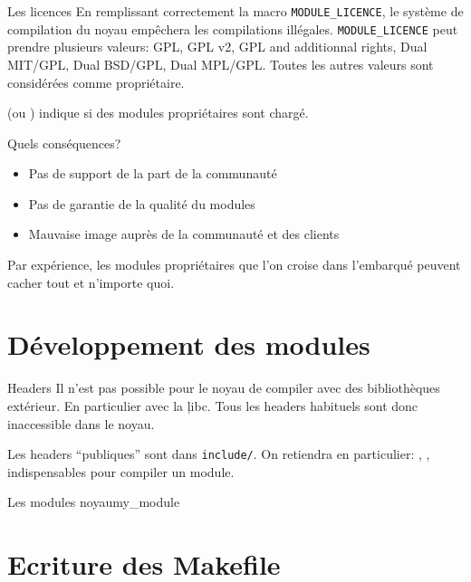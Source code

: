 \begin{frame}[fragile=singleslide]{Les licences}
  En  remplissant  correctement  la  macro  \verb+MODULE_LICENCE+,  le
  système   de  compilation  du   noyau  empêchera   les  compilations
  illégales.   \verb+MODULE_LICENCE+ peut  prendre  plusieurs valeurs:
  GPL, GPL v2, GPL and additionnal rights, Dual MIT/GPL, Dual BSD/GPL,
  Dual  MPL/GPL.  Toutes  les  autres valeurs  sont considérées  comme
  propriétaire.

   (ou  ) indique  si des
  modules propriétaires sont chargé.
  
  Quels conséquences?
  \begin{itemize} 
  \item Pas de support de la part de la communauté
  \item Pas de garantie de la qualité du modules
  \item Mauvaise image auprès de la communauté et des clients
  \end{itemize}

  Par  expérience,  les modules  propriétaires  que  l'on croise  dans
  l'embarqué peuvent cacher tout et n'importe quoi.
\end{frame}

\section{Développement des modules}

\begin{frame}[fragile=singleslide]{Headers}
  Il  n'est  pas   possible  pour  le  noyau  de   compiler  avec  des
  bibliothèques extérieur.  En particulier  avec la \c{libc}. Tous les
  headers habituels sont donc inaccessible dans le noyau.

  Les headers ``publiques'' sont dans \verb+include/+. On retiendra en
  particulier:       ,       ,
   indispensables pour compiler un module.
\end{frame} 

\begin{frame}[fragile=singleslide]{Les modules noyau}{my\_module}
  
\end{frame}

\section{Ecriture des Makefile}

